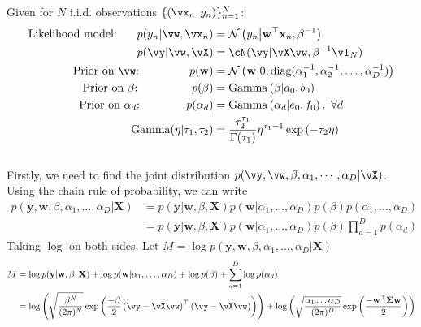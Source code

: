\documentclass[a4paper,11pt]{article}
\begin{document}
\begin{pmisolution} 
\noindent Given for $N$ i.i.d. observations $\{ (\vx_n, y_n) \}_{n=1}^{N}$:
\begin{align}
    \text{Likelihood model: } ~~~~ p(y_n|\vw, \vx_n) &= \mathcal{N}\left(y_n \middle| \textbf{w}^\top\textbf{x}_n, \beta^{-1}\right)
    \nonumber
    \\p(\vy | \vw, \vX) &= \cN(\vy | \vX\vw, \beta^{-1}\vI_N)
    \nonumber
    \\
    \text{Prior on $\vw$: } ~~~~~~~~~~~~ p(\textbf{w}) &= \mathcal{N}\left(\textbf{w} \middle| 0, \text{diag}(\alpha_1^{-1}, \alpha_2^{-1},\ldots, \alpha_D^{-1})\right)
    \nonumber
    \\ \text{Prior on $\beta$: } ~~~~~~~~~~~~~ p(\beta) &= \text{Gamma}\left(\beta \middle|a_0,b_0\right)
    \nonumber
    \\ \text{Prior on $\alpha_d$: } ~~~~~~~~~~~ p(\alpha_d) &= \text{Gamma}\left(\alpha_d \middle| e_0, f_0\right), ~ \forall d
    \nonumber
    \\ \text{Gamma}(\eta | \tau_1, \tau_2) &= \frac{\tau_2^{\tau_1}}{\Gamma(\tau_1)}\eta^{\tau_1-1} \exp{(-\tau_2\eta)}
    \nonumber
\end{align}
\\
\noindent Firstly, we need to find the joint distribution $p(\vy, \vw, \beta, \alpha_1, \cdots, \alpha_D | \vX)$. Using the chain rule of probability, we can write
\begin{align}
    p(\textbf{y},\textbf{w}, \beta, \alpha_1, \ldots, \alpha_D| \textbf{X})&=p(\textbf{y}|\textbf{w}, \beta, \textbf{X})p(\textbf{w}|\alpha_1, \ldots,\alpha_D)p(\beta)p(\alpha_1, \ldots,\alpha_D)
    \nonumber
    \\ &= p(\textbf{y}|\textbf{w}, \beta, \textbf{X})p(\textbf{w}|\alpha_1, \ldots, \alpha_D)p(\beta)\prod_{d=1}^D p(\alpha_d)
    \nonumber
\end{align}
Taking $\log$ on both sides. Let $M = \log p(\textbf{y},\textbf{w}, \beta, \alpha_1,\ldots, \alpha_D| \textbf{X})$
\begin{align}
    M &= \log p(\textbf{y}|\textbf{w}, \beta, \textbf{X}) + \log p(\textbf{w}|\alpha_1, \ldots, \alpha_D) + \log p(\beta) + \sum_{d=1}^D\log p(\alpha_d)
    \nonumber
    \\ &=  \log \left(\sqrt{\frac{\beta^N}{(2\pi)^N}}\exp\left(\frac{-\beta}{2}\left(\vy - \vX\vw\right)^\top\left(\vy - \vX\vw\right)\right)\right) + \log \left(\sqrt{\frac{\alpha_1\ldots \alpha_D}{(2\pi)^D}}\exp\left({\frac{-\textbf{w}^\top\boldsymbol{\Sigma}\textbf{w}}{2}}\right)\right)

\end{align}
\end{pmisolution}
\end{document}
